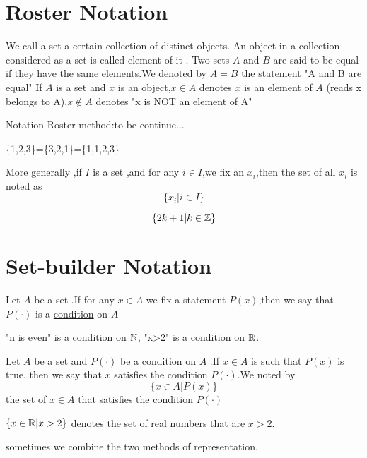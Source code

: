 \documentclass{book}
\begin{document}
\section{Roster Notation}
\begin{definitionenv}
    We call a set a certain collection of distinct objects.
    \newline
    An object in a collection considered as a set is called element of it .
    \newline
    Two sets $A$ and $B$ are said to be equal if they have the same elements.We denoted by $A=B$ the statement "A and B are equal"
    \newline
    If $A$ is a set and $x$ is an object,$x \in A$ denotes $x$ is an element of $A$ (reads x belongs to A),$x \notin A$ denotes "x is NOT an element of A" 
\end{definitionenv}
Notation Roster method:to be continue$\dots$
\begin{exampleenv}
    \{1,2,3\}=\{3,2,1\}=\{1,1,2,3\}
\end{exampleenv}
More generally ,if $I$ is a set ,and for any $i \in I$,we fix an $x_i$,then the set of all $x_i$ is noted as $$\{x_i|i\in I\}$$
\begin{exampleenv}
    $$\{2k+1|k\in \mathbb{Z}\}$$
\end{exampleenv}
\section{Set-builder Notation}
\begin{definitionenv}
    Let $A$ be a set .If for any $x\in A $ we fix a statement $P(x)$,then we say that $P(\cdot)$ is a \underline{condition} on $A$ 
\end{definitionenv}
\begin{exampleenv}
    "n is even" is a condition on $\mathbb{N}$, "x>2" is a condition on $\mathbb{R}$.
\end{exampleenv}
\begin{definitionenv}
    Let $A$ be a set and $P(\cdot)$ be a condition on $A$ .If $x\in A$ is such that $P(x)$ is true, then we say that $x$ satisfies the condition $P(\cdot)$.We noted by $$\{x \in A|P(x)\}$$the set of $x\in A$ that satisfies the condition $P(\cdot)$
\end{definitionenv}
\begin{exampleenv}
    $\{x\in \mathbb{R}|x>2\}$ denotes the set of real numbers that are $x>2$.
\end{exampleenv}
sometimes we combine the two methods of representation.
\end{document}
